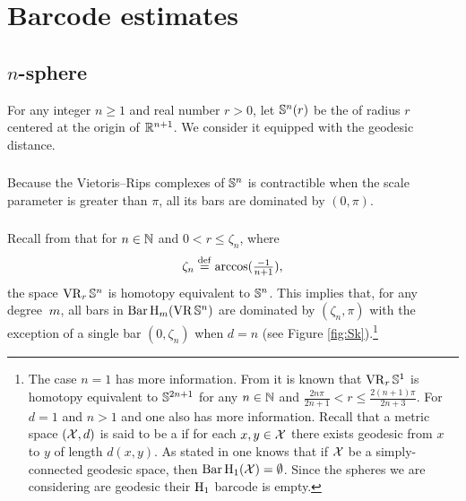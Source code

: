 
\section{Barcode estimates}\label{s:computations}

\subsection{$n$-sphere}\label{ss:Sn}

For any integer $n \geq 1$ and real number $r > 0$, let $\mathbb{S}^n(r)$ be the  of radius $r$ centered at the origin of $\mathbb{R}^{n+1}$.
We consider it equipped with the geodesic distance.

\subsubsection{}

Because the Vietoris--Rips complexes of $\mathbb{S}^n$ is contractible when the scale parameter is greater than $\pi$, all its bars are dominated by $(0, \pi)$.

\subsubsection{} 

Recall from \cite[Thm.~7.1]{lim2020vietoris} that for $n \in \mathbb{N}$ and  $0 < r \leq \zeta_n$, where 
\[\zeta_n \stackrel{\mathrm{def}}{=} \arccos(\tfrac{-1}{n+1}),\] 
the space $\operatorname{VR}_r\mathbb{S}^n$ is homotopy equivalent to $\mathbb{S}^n$.
This implies that, for any degree~$m$, all bars in $\operatorname{Bar}\mathrm{H}_m (\operatorname{VR}\mathbb{S}^n)$ are dominated by $(\zeta_n,\pi)$ with the exception of a single bar $(0,\zeta_n)$ when $d = n$ (see Figure \ref{fig:Sk}).\footnote{
	The case $n = 1$ has more information.
	From \cite[Thm.~7.4]{adamaszek2017vietoris} it is known that $\operatorname{VR}_r\mathbb{S}^1$ is homotopy equivalent to $\mathbb{S}^{2n+1}$ for any $n \in \mathbb{N}$ and $\frac{2n\pi}{2n+1} < r \leq \frac{2(n+1)\pi}{2n+3}$.
	For $d=1$ and $n > 1$ and one also has more information.
	Recall that a metric space $(\mathcal{X}, d)$ is said to be a  if for each $x, y \in \mathcal{X}$ there exists geodesic from $x$ to $y$ of length $d(x, y)$.
	As stated in \cite[Prop.~7.10]{virk20201} one knows that if $\mathcal{X}$ be a simply-connected geodesic space, then $\operatorname{Bar}\mathrm{H}_1(\mathcal{X}) = \emptyset$.
	Since the spheres we are considering are geodesic their $\mathrm{H}_1$ barcode is empty. }

